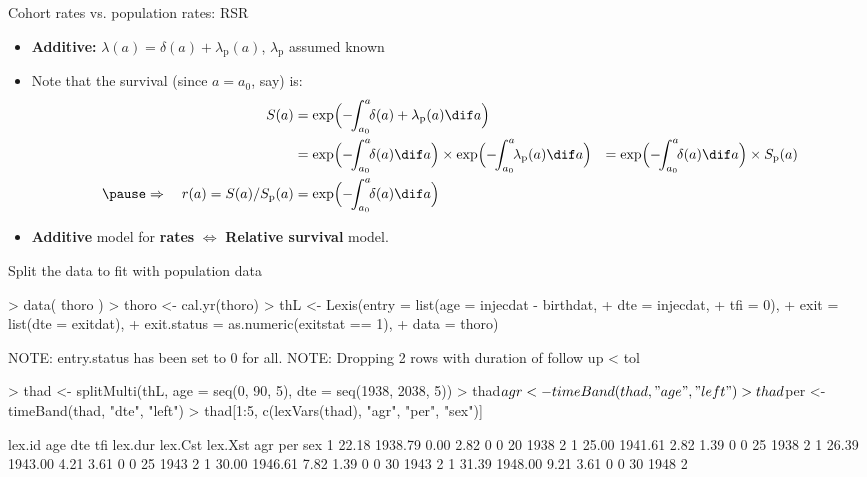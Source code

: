 \begin{frame}{Cohort rates vs. population rates: RSR}
  \begin{itemize}[<+->]
  \item \textbf{Additive:} $\lambda(a) = \delta(a) +
    \lambda_\text{p}(a)$, \quad $\lambda_\text{p}$ assumed known
  \item Note that the survival (since $a=a_0$, say) is: \vspace*{-1ex}
\begin{align*}
     S(a) &= \exp\Bigl(-\!\!\int_{a_0}^a\!\! \delta(a) + \lambda_\text{p}(a) \dif a\Bigr)\\
          &= \exp\Bigl(-\!\!\int_{a_0}^a\!\! \delta(a)          \dif a\Bigr) \times
             \exp\Bigl(-\!\!\int_{a_0}^a\!\! \lambda_\text{p}(a) \dif a\Bigr)
          &= \exp\Bigl(-\!\!  \int_{a_0}^a\!\! \delta(a) \dif a\Bigr) \times S_\text{p}(a)\\
    \pause \Rightarrow \quad
    r(a) = S(a)/S_\text{p}(a) &= \exp\Bigl(-\!\!\int_{a_0}^a\!\! \delta(a) \dif a\Bigr)
  \end{align*}
    \pause
  \item \textbf{Additive} model for \textbf{rates} $\Leftrightarrow$ \textbf{Relative survival} model.
  \end{itemize}
\end{frame}

\begin{frame}[fragile]{Split the data to fit with population data}
\begin{Schunk}
\begin{Sinput}
> data( thoro )
> thoro <- cal.yr(thoro)
> thL <- Lexis(entry = list(age = injecdat - birthdat,
+                           dte = injecdat,
+                           tfi = 0),
+               exit = list(dte = exitdat),
+        exit.status = as.numeric(exitstat == 1),
+               data = thoro)
\end{Sinput}
\begin{Soutput}
NOTE: entry.status has been set to 0 for all.
NOTE: Dropping  2  rows with duration of follow up < tol
\end{Soutput}
\begin{Sinput}
> thad <- splitMulti(thL, age = seq(0, 90, 5), dte = seq(1938, 2038, 5))
> thad$agr <- timeBand(thad, "age", "left")
> thad$per <- timeBand(thad, "dte", "left")
> thad[1:5, c(lexVars(thad), "agr", "per", "sex")]
\end{Sinput}
\begin{Soutput}
 lex.id   age     dte  tfi lex.dur lex.Cst lex.Xst agr  per sex
      1 22.18 1938.79 0.00    2.82       0       0  20 1938   2
      1 25.00 1941.61 2.82    1.39       0       0  25 1938   2
      1 26.39 1943.00 4.21    3.61       0       0  25 1943   2
      1 30.00 1946.61 7.82    1.39       0       0  30 1943   2
      1 31.39 1948.00 9.21    3.61       0       0  30 1948   2
\end{Soutput}
\end{Schunk}
\end{frame}

